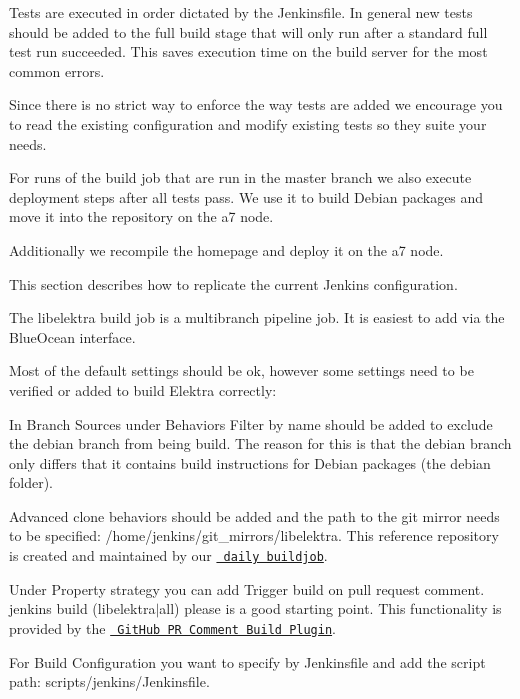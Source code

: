 Tests are executed in order dictated by the Jenkinsfile. In general new tests should be added to the \textquotesingle{}full build stage\textquotesingle{} that will only run after a standard full test run succeeded. This saves execution time on the build server for the most common errors.

Since there is no strict way to enforce the way tests are added we encourage you to read the existing configuration and modify existing tests so they suite your needs.

For runs of the build job that are run in the master branch we also execute deployment steps after all tests pass. We use it to build Debian packages and move it into the repository on the a7 node.

Additionally we recompile the homepage and deploy it on the a7 node.

This section describes how to replicate the current Jenkins configuration.

The {\ttfamily libelektra} build job is a multibranch pipeline job. It is easiest to add via the Blue\+Ocean interface.

Most of the default settings should be ok, however some settings need to be verified or added to build Elektra correctly\+:


\begin{DoxyItemize}
\item In Branch Sources under Behaviors {\ttfamily Filter by name} should be added to exclude the {\ttfamily debian} branch from being build. The reason for this is that the {\ttfamily debian} branch only differs that it contains build instructions for Debian packages (the {\ttfamily debian} folder).
\item {\ttfamily Advanced clone behaviors} should be added and the path to the git mirror needs to be specified\+: {\ttfamily /home/jenkins/git\+\_\+mirrors/libelektra}. This reference repository is created and maintained by our \href{https://build.libelektra.org/job/libelektra-daily/}{\texttt{ daily buildjob}}.
\item Under Property strategy you can add {\ttfamily Trigger build on pull request comment}. {\ttfamily jenkins build (libelektra$\vert$all) please} is a good starting point. This functionality is provided by the \href{https://wiki.jenkins-ci.org/display/JENKINS/GitHub+PR+Comment+Build+Plugin}{\texttt{ Git\+Hub PR Comment Build Plugin}}.
\item For Build Configuration you want to specify {\ttfamily by Jenkinsfile} and add the script path\+: {\ttfamily scripts/jenkins/\+Jenkinsfile}.
\end{DoxyItemize}

